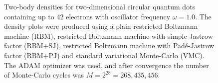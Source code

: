 \begin{landscape}
\begin{figure}
		\hspace{0.1cm}
		
		\caption{Two-body densities for two-dimensional circular quantum dots containing up to 42 electrons with oscillator frequency $\omega=1.0$. The density plots were produced using a plain restricted Boltzmann machine (RBM), restricted Boltzmann machine with simple Jastrow factor (RBM+SJ), restricted Boltzmann machine with Padé-Jastrow factor (RBM+PJ) and standard variational Monte-Carlo (VMC). The  ADAM optimizer was used, and after convergence the number of Monte-Carlo cycles was $M=2^{28}=268,435,456$.}%
		\label{fig:TB_2D_1p0w}
	\end{figure}
\end{landscape}


